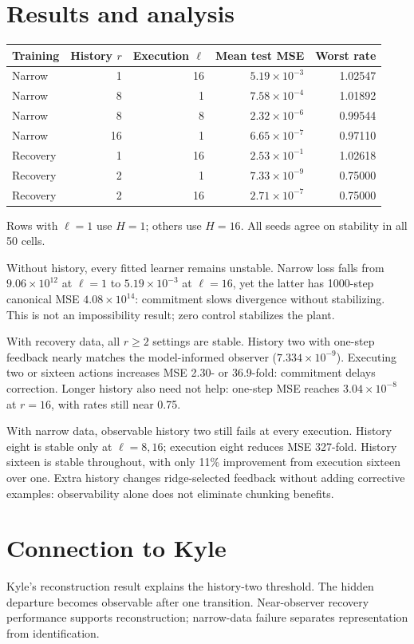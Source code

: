 \documentclass{l4dc2026}
\begin{document}
\section{Results and analysis}
\begin{center}\small
\begin{tabular}{lrrrr}\toprule
Training & History $r$ & Execution $\ell$ & Mean test MSE & Worst rate\\\midrule
Narrow & 1 & 16 & $5.19\times10^{-3}$ & 1.02547\\
Narrow & 8 & 1 & $7.58\times10^{-4}$ & 1.01892\\
Narrow & 8 & 8 & $2.32\times10^{-6}$ & 0.99544\\
Narrow & 16 & 1 & $6.65\times10^{-7}$ & 0.97110\\
Recovery & 1 & 16 & $2.53\times10^{-1}$ & 1.02618\\
Recovery & 2 & 1 & $7.33\times10^{-9}$ & 0.75000\\
Recovery & 2 & 16 & $2.71\times10^{-7}$ & 0.75000\\\bottomrule
\end{tabular}
\end{center}
\noindent Rows with $\ell=1$ use $H=1$; others use $H=16$. All seeds agree on stability in all 50 cells.

Without history, every fitted learner remains unstable. Narrow loss falls from $9.06\times10^{12}$ at $\ell=1$ to $5.19\times10^{-3}$ at $\ell=16$, yet the latter has 1000-step canonical MSE $4.08\times10^{14}$: commitment slows divergence without stabilizing. This is not an impossibility result; zero control stabilizes the plant.

With recovery data, all $r\ge2$ settings are stable. History two with one-step feedback nearly matches the model-informed observer ($7.334\times10^{-9}$). Executing two or sixteen actions increases MSE 2.30- or 36.9-fold: commitment delays correction. Longer history also need not help: one-step MSE reaches $3.04\times10^{-8}$ at $r=16$, with rates still near 0.75.

With narrow data, observable history two still fails at every execution. History eight is stable only at $\ell=8,16$; execution eight reduces MSE 327-fold. History sixteen is stable throughout, with only 11\% improvement from execution sixteen over one. Extra history changes ridge-selected feedback without adding corrective examples: observability alone does not eliminate chunking benefits.

\section{Connection to Kyle}
Kyle's reconstruction result explains the history-two threshold. The hidden departure becomes observable after one transition. Near-observer recovery performance supports reconstruction; narrow-data failure separates representation from identification.
\end{document}

